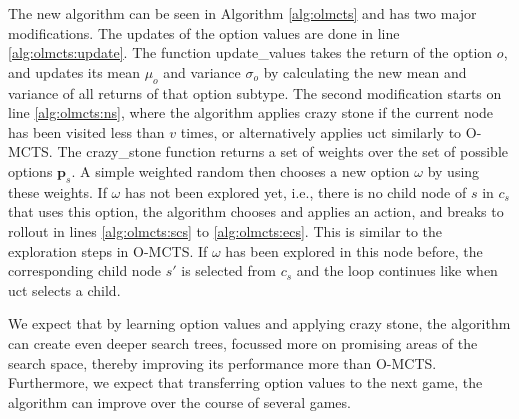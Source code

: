 The new algorithm can be seen in Algorithm \ref{alg:olmcts} and has two major
modifications. The updates of the option values are done in line
\ref{alg:olmcts:update}. The function \textsf{update\_values} takes the return
of the option $o$, and updates its mean $\mu_o$ and variance $\sigma_o$ by
calculating the new mean and variance of all returns of that option subtype. The
second modification starts on line \ref{alg:olmcts:ns}, where the algorithm
applies crazy stone if the current node has been visited less than $v$ times, or
alternatively applies \textsf{uct} similarly to O-MCTS. The
\textsf{crazy\_stone} function returns a set of weights over the set of possible
options $\mathbf{p}_s$. A simple weighted random then chooses a new option
$\omega$ by using these weights.  If $\omega$ has not been explored yet, i.e.,
there is no child node of $s$ in $c_s$ that uses this option, the algorithm
chooses and applies an action, and breaks to rollout in lines
\ref{alg:olmcts:scs} to \ref{alg:olmcts:ecs}. This is similar to the exploration
steps in O-MCTS. If $\omega$ has been explored in this node before, the
corresponding child node $s'$ is selected from $c_s$ and the loop continues
like when \textsf{uct} selects a child.

We expect that by learning option values and applying crazy stone, the algorithm
can create even deeper search trees, focussed more on promising areas of the
search space, thereby improving its performance more than O-MCTS. Furthermore,
we expect that transferring option values to the next game, the algorithm can
improve over the course of several games.
